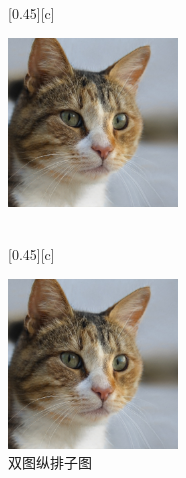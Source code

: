 \documentclass[12pt,a4paper,UTF8]{article}
\begin{document}
    \begin{figure}[!htbp]
        \centering
        [0.45\textwidth][c]{
            \centering
            \includegraphics[width=0.4\textwidth]{example}
             
        }\\[0.5cm]%
        [0.45\textwidth][c]{
            \centering
            \includegraphics[width=0.4\textwidth]{example}
             
        } 
        \caption{双图纵排子图}
         
    \end{figure}
    
\end{document}
